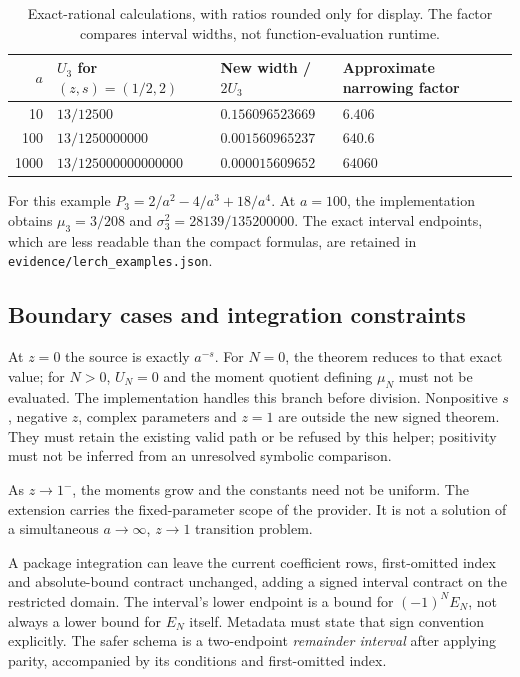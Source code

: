 \documentclass[11pt,a4paper]{article}
\newcommand{\code}[1]{\nolinkurl{#1}}
\begin{document}
\begin{table}[htbp]
\centering
\begin{tabular}{@{}rlll@{}}
\toprule
$a$ & $U_3$ for $(z,s)=(1/2,2)$ & New width / $2U_3$ & Approximate narrowing factor\\
\midrule
10 & $13/12500$ & $0.156096523669$ & $6.406$\\
100 & $13/1250000000$ & $0.001560965237$ & $640.6$\\
1000 & $13/125000000000000$ & $0.000015609652$ & $64060$\\
\bottomrule
\end{tabular}
\caption{Exact-rational calculations, with ratios rounded only for display. The factor compares interval widths, not function-evaluation runtime.}
\end{table}

For this example $P_3=2/a^2-4/a^3+18/a^4$. At $a=100$, the implementation obtains $\mu_3=3/208$ and $\sigma_3^2=28139/135200000$. The exact interval endpoints, which are less readable than the compact formulas, are retained in \code{evidence/lerch_examples.json}.

\subsection{Boundary cases and integration constraints}
At $z=0$ the source is exactly $a^{-s}$. For $N=0$, the theorem reduces to that exact value; for $N>0$, $U_N=0$ and the moment quotient defining $\mu_N$ must not be evaluated. The implementation handles this branch before division. Nonpositive $s$, negative $z$, complex parameters and $z=1$ are outside the new signed theorem. They must retain the existing valid path or be refused by this helper; positivity must not be inferred from an unresolved symbolic comparison.

As $z\to1^-$, the moments grow and the constants need not be uniform. The extension carries the fixed-parameter scope of the provider. It is not a solution of a simultaneous $a\to\infty$, $z\to1$ transition problem.

A package integration can leave the current coefficient rows, first-omitted index and absolute-bound contract unchanged, adding a signed interval contract on the restricted domain. The interval's lower endpoint is a bound for $(-1)^NE_N$, not always a lower bound for $E_N$ itself. Metadata must state that sign convention explicitly. The safer schema is a two-endpoint \emph{remainder interval} after applying parity, accompanied by its conditions and first-omitted index.
\end{document}

